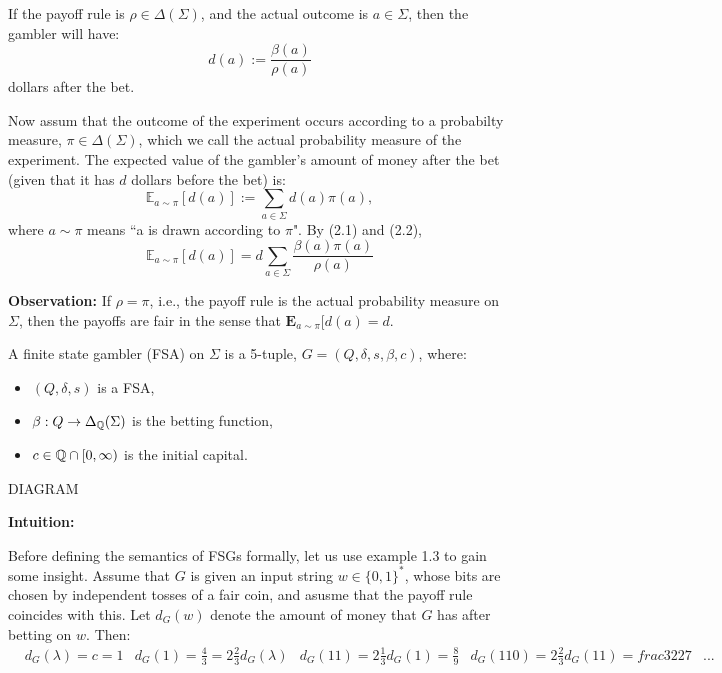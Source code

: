 \documentclass[../main.tex]{subfiles}
\begin{document}
    If the payoff rule is $\rho \in \Delta(\Sigma)$, and the actual outcome is
$a \in \Sigma$, then the gambler will have:
\begin{equation}
    d(a) := \frac{\beta(a)}{\rho(a)}
\end{equation}
dollars after the bet.

    Now assum that the outcome of the experiment occurs according to a probabilty
measure, $\pi \in \Delta(\Sigma)$, which we call the actual probability measure
of the experiment. The expected value of the gambler's amount of money after the
bet (given that it has $d$ dollars before the bet) is:
\begin{equation}
    \mathbb{E}_{a\sim\pi}[d(a)] := \sum_{a \in \Sigma} d(a)\pi(a),
\end{equation}
where $a\sim\pi$ means ``a is drawn according to $\pi$". By (2.1) and (2.2),
\begin{equation}
    \mathbb{E}_{a\sim\pi}[d(a)] = d \sum_{a \in \Sigma} \frac{\beta(a)\pi(a)}{\rho(a)}
\end{equation}

\textbf{Observation:}
If $\rho = \pi$, i.e., the payoff rule is the actual probability measure on $\Sigma$,
then the payoffs are fair in the sense that $\textbf{E}_{a \sim \pi}[d(a) = d$.

\begin{defn}
    A finite state gambler (FSA) on $\Sigma$ is a 5-tuple, $G = (Q, \delta, s, \beta, c)$, where:
\begin{itemize}
    \item $(Q, \delta, s)$ is a FSA,
    \item $\beta: Q \rightarrow \Delta_{\mathbb{Q}}(\Sigma)$ is the betting function,
    \item $c \in \mathbb{Q} \cap [0, \infty)$ is the initial capital.
\end{itemize}
\end{defn}

\begin{exmp}
    DIAGRAM
\end{exmp}

\textbf{Intuition:}

    Before defining the semantics of FSGs formally, let us use example 1.3 to
gain some insight. Assume that $G$ is given an input string $w \in \{0, 1\}^{*}$,
whose bits are chosen by independent tosses of a fair coin, and asusme that the
payoff rule coincides with this. Let $d_{G}(w)$ denote the amount of money that
$G$ has after betting on $w$. Then:
\begin{align*}
    & d_{G}(\lambda) = c = 1
    & d_{G}(1) = \frac{4}{3} = 2\frac{2}{3}d_{G}(\lambda)
    & d_{G}(11) = 2\frac{1}{3}d_{G}(1) = \frac{8}{9}
    & d_{G}(110) = 2\frac{2}{3}d_{G}(11) = frac{32}{27}
    & ...
\end{align*}
\end{document}
